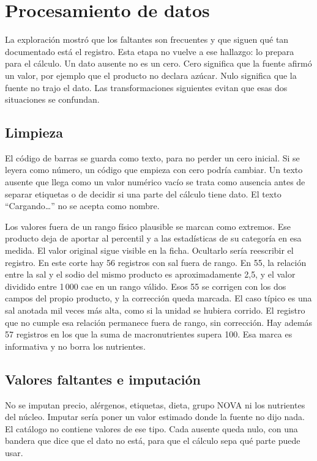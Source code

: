 \section{Procesamiento de datos}

La exploración mostró que los faltantes son frecuentes y que siguen qué tan documentado está el registro. Esta etapa no vuelve a ese hallazgo: lo prepara para el cálculo. Un dato ausente no es un cero. Cero significa que la fuente afirmó un valor, por ejemplo que el producto no declara azúcar. Nulo significa que la fuente no trajo el dato. Las transformaciones siguientes evitan que esas dos situaciones se confundan.

\subsection{Limpieza}

El código de barras se guarda como texto, para no perder un cero inicial. Si se leyera como número, un código que empieza con cero podría cambiar. Un texto ausente que llega como un valor numérico vacío se trata como ausencia antes de separar etiquetas o de decidir si una parte del cálculo tiene dato. El texto \enquote{Cargando…} no se acepta como nombre.

Los valores fuera de un rango físico plausible se marcan como extremos. Ese producto deja de aportar al percentil y a las estadísticas de su categoría en esa medida. El valor original sigue visible en la ficha. Ocultarlo sería reescribir el registro. En este corte hay 56 registros con sal fuera de rango. En 55, la relación entre la sal y el sodio del mismo producto es aproximadamente 2{,}5, y el valor dividido entre 1\,000 cae en un rango válido. Esos 55 se corrigen con los dos campos del propio producto, y la corrección queda marcada. El caso típico es una sal anotada mil veces más alta, como si la unidad se hubiera corrido. El registro que no cumple esa relación permanece fuera de rango, sin corrección. Hay además 57 registros en los que la suma de macronutrientes supera 100. Esa marca es informativa y no borra los nutrientes.

\subsection{Valores faltantes e imputación}

No se imputan precio, alérgenos, etiquetas, dieta, grupo NOVA ni los nutrientes del núcleo. Imputar sería poner un valor estimado donde la fuente no dijo nada. El catálogo no contiene valores de ese tipo. Cada ausente queda nulo, con una bandera que dice que el dato no está, para que el cálculo sepa qué parte puede usar.

